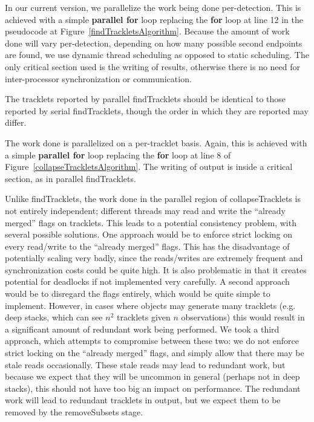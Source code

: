  In our current version, we
parallelize the work being done per-detection.  This is achieved with
a simple \textbf{parallel for} loop replacing the \textbf{for} loop at
line 12 in the pseudocode at Figure~\ref{findTrackletsAlgorithm}.  Because the amount of work
done will vary per-detection, depending on how many possible second
endpoints are found, we use dynamic thread scheduling as opposed to
static scheduling.  The only critical section used is the writing of
results, otherwise there is no need for inter-processor
synchronization or communication.

The tracklets reported by parallel findTracklets should be identical
to those reported by serial findTracklets, though the order in which
they are reported may differ.


 The work done is
parallelized on a per-tracklet basis.  Again, this is achieved with a
simple \textbf{parallel for} loop replacing the \textbf{for} loop at
line 8 of Figure~\ref{collapseTrackletsAlgorithm}.  The writing of output is
inside a critical section, as in parallel findTracklets.

Unlike findTracklets, the work done in the parallel region of
collapseTracklets is not entirely independent; different threads may
read and write the ``already merged'' flags on tracklets.  This leads
to a potential consistency problem, with several possible solutions.
One approach would be to enforce strict locking on every read/write to
the ``already merged'' flags.  This has the disadvantage of
potentially scaling very badly, since the reads/writes are extremely
frequent and synchronization costs could be quite high.  It is also
problematic in that it creates potential for deadlocks if not
implemented very carefully.  A second approach would be to disregard
the flags entirely, which would be quite simple to implement. However,
in cases where objects may generate many tracklets (e.g. deep stacks,
which can see $n^2$ tracklets given $n$ observations) this would
result in a significant amount of redundant work being performed.  We
took a third approach, which attempts to compromise between these two: we do
not enforce strict locking on the ``already merged'' flags, and simply
allow that there may be stale reads occasionally.  These stale reads
may lead to redundant work, but because we expect that they will be
uncommon in general (perhaps not in deep stacks), this should not have
too big an impact on performance. The redundant work will lead to redundant tracklets in output, but we
expect them to be removed by the removeSubsets stage.

